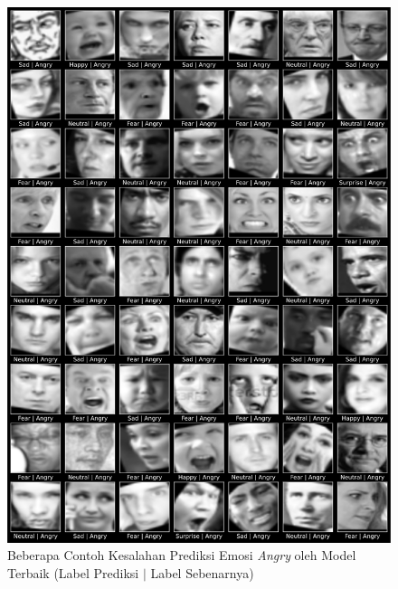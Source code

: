 \begin{figure}[t]
    \centering
    \includegraphics[width=14cm]{gambar/contoh_hasil_prediksi_false_angry.png}
    \caption{Beberapa Contoh Kesalahan Prediksi Emosi \textit{Angry} oleh Model Terbaik (Label Prediksi $|$ Label Sebenarnya)}
    \label{fig:hasilprediksifalse1}
\end{figure}

